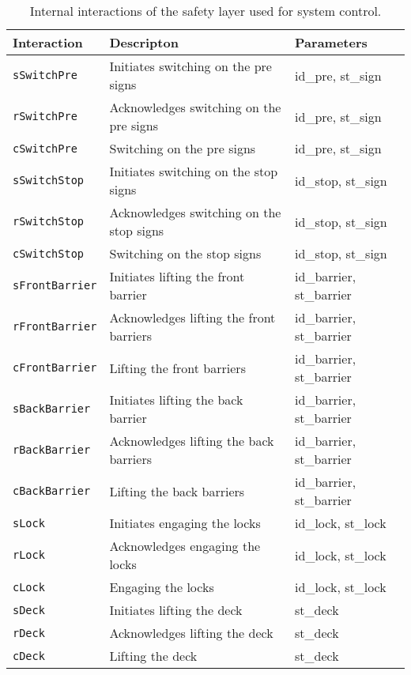 %
\begin{table}%
\begin{tabular}{lll}
      \textbf{Interaction} &	\textbf{Descripton}	&	\textbf{Parameters}\\
      \hline

      \texttt{sSwitchPre} & Initiates switching on the pre signs & id\_pre, st\_sign\\
      \texttt{rSwitchPre} & Acknowledges switching on the pre signs & id\_pre, st\_sign\\
      \texttt{cSwitchPre} & Switching on the pre signs & id\_pre, st\_sign\\

      \texttt{sSwitchStop} & Initiates switching on the stop signs & id\_stop, st\_sign\\
      \texttt{rSwitchStop} & Acknowledges switching on the stop signs & id\_stop, st\_sign\\
      \texttt{cSwitchStop} & Switching on the stop signs & id\_stop, st\_sign\\

      \texttt{sFrontBarrier} & Initiates lifting the front barrier & id\_barrier, st\_barrier\\
      \texttt{rFrontBarrier} & Acknowledges lifting the front barriers & id\_barrier, st\_barrier\\
      \texttt{cFrontBarrier} & Lifting the front barriers & id\_barrier, st\_barrier\\

      \texttt{sBackBarrier} & Initiates lifting the back barrier & id\_barrier, st\_barrier\\
      \texttt{rBackBarrier} & Acknowledges lifting the back barriers & id\_barrier, st\_barrier\\
      \texttt{cBackBarrier} & Lifting the back barriers & id\_barrier, st\_barrier\\

      \texttt{sLock} & Initiates engaging the locks & id\_lock, st\_lock\\
      \texttt{rLock} & Acknowledges engaging the locks & id\_lock, st\_lock\\
      \texttt{cLock} & Engaging the locks & id\_lock, st\_lock\\

      \texttt{sDeck} & Initiates lifting the deck & st\_deck\\
      \texttt{rDeck} & Acknowledges lifting the deck & st\_deck\\
      \texttt{cDeck} & Lifting the deck & st\_deck\\
\end{tabular}
\caption{Internal interactions of the safety layer used for system control.}
\label{tab:tau}
\end{table}
